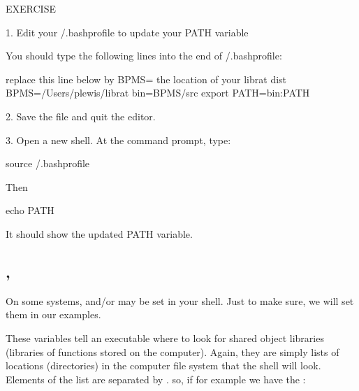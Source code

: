 \documentclass[letterpaper,10pt,english]{sphinxmanual}
\begin{document}
\begin{sphinxVerbatim}[commandchars=\\\{\}]
EXERCISE

    1. Edit your \PYGZti{}/.bash\PYGZus{}profile to update your PATH variable

    You should type the following lines into the end of \PYGZti{}/.bash\PYGZus{}profile:

    \PYGZsh{} replace this line below by BPMS= the location of your librat dist
    BPMS=/Users/plewis/librat
    bin=\PYGZdl{}BPMS/src
    export PATH=\PYGZdq{}\PYGZdl{}bin:\PYGZdl{}PATH\PYGZdq{}


    2. Save the file and quit the editor.

    3. Open a new shell. At the command prompt, type:

            source \PYGZti{}/.bash\PYGZus{}profile

    Then

            echo \PYGZdl{}PATH

    It should show the updated PATH variable.
\end{sphinxVerbatim}


\subsection{, }
\label{\detokenize{Appendix1:LD_LIBRARY_PATH,-DYLD_LIBRARY_PATH}}
On some systems,  and/or  may be set in your  shell. Just to make sure, we will set them in our examples.

These variables tell an executable where to look for shared object libraries (libraries of functions stored on the computer). Again, they are simply lists of locations (directories) in the computer file system that the shell will look. Elements of the list are separated by \sphinxcode{\sphinxupquote{:}}. so, if for example we have the :

\begin{sphinxVerbatim}[commandchars=\\\{\}]
\end{sphinxVerbatim}
\end{document}
